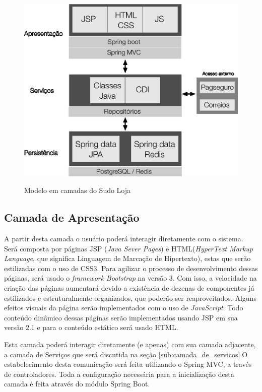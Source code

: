 \documentclass[a4paper,12pt]{monografia}
\begin{document}
\begin{figure}[H]
\centering
\caption{Modelo em camadas do Sudo Loja}
\centering
\includegraphics[scale=0.7]{img/representacao-pa.eps}\\
\label{fig:representacao-pa}
\end{figure}

\subsection{Camada de Apresentação} %
\label{sub:camada_de_apresentacao}

A partir desta camada o usuário poderá interagir diretamente com o sistema. Será composta por páginas JSP (\textit{Java Sever Pages}) e HTML(\textit{HyperText Markup Language}, que significa Linguagem de Marcação de Hipertexto), estas que serão estilizadas com o uso de CSS3. Para agilizar o processo de desenvolvimento dessas páginas, será usado o \textit{framework} \textit{Bootstrap} na versão 3. Com isso, a velocidade na criação das páginas aumentará devido a existência de dezenas de componentes já estilizados e estruturalmente organizados, que poderão ser reaproveitados. Alguns efeitos visuais da página serão implementados com o uso de \textit{JavaScript}. Todo conteúdo dinâmico dessas páginas serão implementados usando JSP em sua versão 2.1 e para o conteúdo estático será usado HTML.

Esta camada poderá interagir diretamente (e apenas) com sua camada adjacente, a camada de Serviços que será discutida na seção \ref{sub:camada_de_servicos}.O estabelecimento desta comunicação será feita utilizando o Spring MVC, a
través de controladores. Toda a configuração necessária para a inicialização desta camada é feita através do  módulo Spring Boot.
\end{document}

